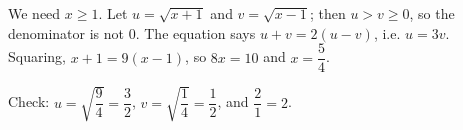 We need $x\ge1$. Let $u=\sqrt{x+1}$ and $v=\sqrt{x-1}$; then $u>v\ge0$, so the denominator is not $0$. The equation says $u+v=2(u-v)$, i.e. $u=3v$. Squaring, $x+1=9(x-1)$, so $8x=10$ and $x=\boxed{\dfrac54}$.

Check: $u=\sqrt{\dfrac94}=\dfrac32$, $v=\sqrt{\dfrac14}=\dfrac12$, and $\dfrac{2}{1}=2$.
